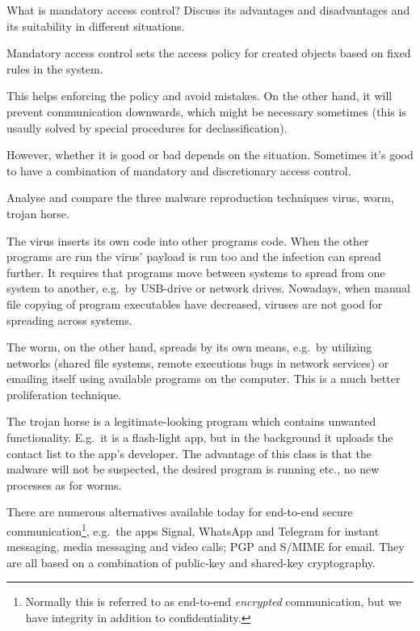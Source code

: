   
\question[3]
What is mandatory access control?
Discuss its advantages and disadvantages and its suitability in different 
situations.

\begin{solution}
  Mandatory access control sets the access policy for created objects based on 
  fixed rules in the system.

  This helps enforcing the policy and avoid mistakes.
  On the other hand, it will prevent communication downwards, which might be 
  necessary sometimes (this is usaully solved by special procedures for 
  declassification).

  However, whether it is good or bad depends on the situation.
  Sometimes it's good to have a combination of mandatory and discretionary 
  access control.
\end{solution}


\question[3]
  Analyse and compare the three malware reproduction techniques
  virus,
  worm,
  trojan horse.

  \begin{solution}
    The virus inserts its own code into other programs code.
    When the other programs are run the virus' payload is run too and the 
    infection can spread further.
    It requires that programs move between systems to spread from one system to 
    another, e.g.\ by USB-drive or network drives.
    Nowadays, when manual file copying of program executables have decreased, 
    viruses are not good for spreading across systems.

    The worm, on the other hand, spreads by its own means, e.g.\ by utilizing 
    networks (shared file systems, remote executions bugs in network services) 
    or emailing itself using available programs on the computer.
    This is a much better proliferation technique.

    The trojan horse is a legitimate-looking program which contains unwanted 
    functionality.
    E.g.\ it is a flash-light app, but in the background it uploads the contact 
    list to the app's developer.
    The advantage of this class is that the malware will not be suspected, the 
    desired program is running etc., no new processes as for worms.
  \end{solution}



\question[3]
  There are numerous alternatives available today for end-to-end secure 
  communication\footnote{%
    Normally this is referred to as end-to-end \emph{encrypted} communication, 
    but we have integrity in addition to confidentiality.
  }, e.g.\ the apps Signal, WhatsApp and Telegram for instant messaging, media 
  messaging and video calls; PGP and S/MIME for email.
  They are all based on a combination of public-key and shared-key cryptography.

